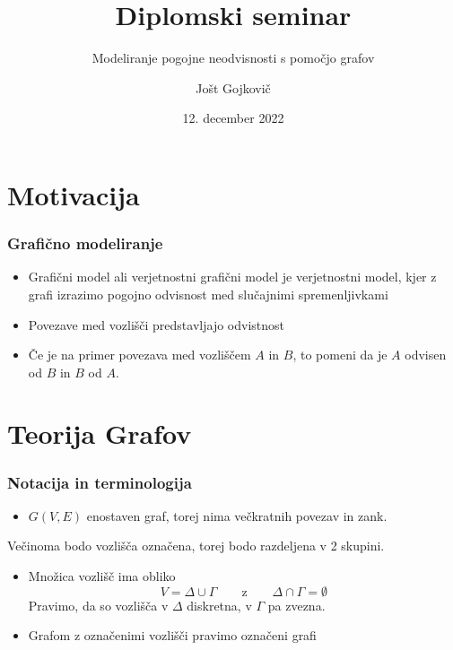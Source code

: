 \documentclass{beamer}
\title{Diplomski seminar}
\subtitle{Modeliranje pogojne neodvisnosti s pomočjo grafov}
\author{Jošt Gojkovič}
\institute[FMF] {Fakulteta za matematiko in fiziko}
\date{12. december 2022}
\begin{document}
\begin{frame}
    \titlepage         %
  \end{frame}
  

\section{Motivacija}

\begin{frame}
    \frametitle{Grafično modeliranje}
    \begin{itemize}
        \item Grafični model ali verjetnostni grafični model je verjetnostni model, kjer z 
        grafi izrazimo pogojno odvisnost med slučajnimi spremenljivkami
        \item Povezave med vozlišči predstavljajo odvistnost
        \item Če je na primer povezava med vozliščem $A$ in $B$, to pomeni da je $A$ odvisen od $B$
        in $B$ od $A$. 
    \end{itemize}
   
\end{frame}

\section{Teorija Grafov}

\begin{frame}
    \frametitle{Notacija in terminologija}
    \begin{itemize}
        \item $G(V,E)$ enostaven graf, torej nima večkratnih povezav in zank. 
    \end{itemize} 
    Večinoma bodo vozlišča označena, torej bodo razdeljena v 2 skupini.
    \begin{itemize}
        \item Množica vozlišč ima obliko 
        $$ V = \Delta \cup \Gamma \qquad \text{z} \qquad \Delta \cap  \Gamma = \emptyset  $$ 
        Pravimo, da so vozlišča v $\Delta$ diskretna, v $\Gamma$ pa zvezna.  
        \item Grafom z označenimi vozlišči pravimo označeni grafi 
    \end{itemize}
\end{frame}
\end{document}
